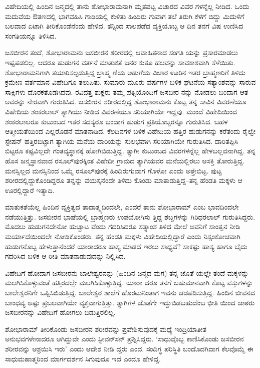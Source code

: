 ವಿಹೇದಿಯಲ್ಲಿ ಹಿಂದಿನ ಜನ್ಮದಲ್ಲಿ ತಾನು ಶೋಭಾರಾಮನಾಗಿ ಮೃತಪಟ್ಟ ವಿಚಾರದ ವಿವರ ಗಳನ್ನೆಲ್ಲ ನೀಡಿದ. ಒಂದು ಮದುವೆಯ ಔತಣದಲ್ಲಿ ಭಾಗವಹಿಸಿ ಗಾಡಿಯಲ್ಲಿ ಕುಳಿತು ಹಿಂದಿರು ಗುವಾಗ ತಲೆ ತಿರುಗಿ ಕೆಳಗೆ ಬಿದ್ದು ಮಿದುಳಿಗೆ ಬಲವಾದ ಏಟಾಗಿ ತೀರಿಕೊಂಡೆನೆಂದು ಹೇಳಿದ. ತನ್ನಿಂದ ಸಾಲಪಡೆದ ವ್ಯಕ್ತಿಯೊಬ್ಬ ಆ ದಿನ ತನಗೆ ವಿಷ ಉಣಿಸಿದ ಸಂಗತಿಯನ್ನೂ ತಿಳಿಸಿದ.

ಜಸಬೀರನ ತಂದೆ, ಶೋಭಾರಾಮನು ಜಸಬೀರನ ಶರೀರದಲ್ಲಿ ಆವಾಹಿತನಾದ ಸಂಗತಿ ಯನ್ನು ಪ್ರಸಾರಮಾಡಲು ಇಷ್ಟಪಡಲಿಲ್ಲ. ಆದರೂ ಹುಡುಗನ ವರ್ತನೆ ಮಾತುಕತೆ ಜನರ ಕುತೂ ಹಲವನ್ನು ಸಾವಕಾಶವಾಗಿ ಸೆಳೆಯಿತು. ಶೋಭಾರಾಮನಿಗಾಗಿ ತಯಾರಿಸಲ್ಪಡುತ್ತಿದ್ದ ಬ್ರಾಹ್ಮ ಣಿಯ ಅಡುಗೆಯ ವಿಚಾರ ಊರಿನ ಇತರ ಬ್ರಾಹ್ಮಣರಿಗೆ ತಿಳಿದು ಕ್ರಮೇಣ ವರ್ತಮಾನ ವಿಹೇದಿಗೂ ತಲುಪಿತು. ಸುಮಾರು ಮೂರು ವರ್ಷಗಳ ಬಳಿಕ ಘಟನೆಯ ಸತ್ಯಾಂಶವನ್ನು ಸಾರುವ ಸಾಕ್ಷಿಗಳು ದೊರಕತೊಡಗಿದವು. ರವಿದತ್ತ ಶುಕ್ಲರು ತಮ್ಮ ಪತ್ನಿಯೊಂದಿಗೆ ಜಸಬೀರ ನನ್ನು ನೋಡಲು ಬಂದಾಗ ಆತ ಅವರನ್ನು ನೇರವಾಗಿ ಗುರುತಿಸಿದ. ಜಸಬೀರನ ಶರೀರದಲ್ಲಿದ್ದ ಶೋಭಾರಾಮನು ಕೊಟ್ಟ ತನ್ನ ಸಾವಿನ ವಿವರಣೆಯೂ ವಿಹೇದಿಯ ಶಂಕರಲಾಲ್ ತ್ಯಾಗಿಯು ನೀಡಿದ ವಿವರಣೆಯೂ ಸರಿಯಾಗಿಯೇ ಇದ್ದವು. ಮುಂದೆ ವಿಹೇದಿಯಿಂದ ಶಂಕರಲಾಲರೂ ಕುಟುಂಬದ ಇತರ ಸದಸ್ಯರೂ ಬಂದಾಗ ಹುಡುಗ ಪ್ರತಿಯೊಬ್ಬರನ್ನೂ ಗುರುತಿಸಿದ. ಬಹಳ ಆತ್ಮೀಯತೆಯಿಂದ ಎಲ್ಲರೊಡನೆ ಮಾತನಾಡಿದ. ಕೆಲದಿನಗಳ ಬಳಿಕ ವಿಹೇದಿಯ ಹತ್ತಿರ ಹುಡುಗನನ್ನು ಕರೆತಂದು ರೈಲ್ವೇ ಸ್ಟೇಷನ್ ಹತ್ತಿರಬಿಟ್ಟಾಗ ತ್ಯಾಗಿಯ ಮನೆಯ ದಾರಿಯನ್ನು ಸುಲಭವಾಗಿ ಸರಿಯಾಗಿಯೇ ಗುರುತಿಸಿದ. ದಾರಿತಪ್ಪಿಸಿ ಬಿಟ್ಟರೂ ಕಷ್ಟವಿಲ್ಲದೇ ಗಂತವ್ಯಸ್ಥಾನಕ್ಕೆ ಹೋಗಿಬಿಡುತ್ತಿದ್ದ. ತ್ಯಾಗೀ ಕುಟುಂಬದ ವಿವರಗಳನ್ನೆಲ್ಲ ಹೇಳಬಲ್ಲವನಾಗಿದ್ದ. ತನ್ನ ಹೊಸ ಜನ್ಮಸ್ಥಾನವಾದ ರಸೂಲ್​ಪುರಕ್ಕಿಂತ ವಿಹೇದೀ ಗ್ರಾಮದ ತ್ಯಾಗಿಯವರ ಮನೆಯಲ್ಲಿರಲು ಆಸಕ್ತಿ ತೋರುತ್ತಿದ್ದ. ಮನಸ್ಸಿಲ್ಲದ ಮನಸ್ಸಿನಿಂದ ಒಮ್ಮೆ ರಸೂಲ್​ಪುರಕ್ಕೆ ಹಿಂದಿರುಗುವಾಗ ಗೊಳೋ ಎಂದು ಅತ್ತೇಬಿಟ್ಟ. ಪುಟ್ಟ ಶರೀರದಲ್ಲಿದ್ದುಕೊಂಡಿದ್ದರೂ ತನ್ನನ್ನು ವಯಸ್ಕನೆಂದೇ ತಿಳಿದು ಕೊಂಡು ಮಾತಾಡುತ್ತಿದ್ದ–ತನ್ನ ಹೆಂಡತಿ ಮಕ್ಕಳು ಆ ಊರಲ್ಲಿದ್ದಾರೆ ಇತ್ಯಾದಿ.

ಮಾತುಕತೆಯೆಲ್ಲ ಹಿಂದಿನ ವ್ಯಕ್ತಿತ್ವದ ತಾದಾತ್ಮ್ಯದಿಂದಲೇ, ಎಂದರೆ ತಾನು ಶೋಭಾರಾಮ್ ಎಂಬ ಭಾವದಿಂದಲೇ ನಡೆಯುತ್ತಿತ್ತು. ಜಸಬೀರನ ಭಾಷೆಯಲ್ಲಿ ಬ್ರಾಹ್ಮಣರು ಉಪಯೋಗಿಸು ತ್ತಿದ್ದ ಶಬ್ದಗಳನ್ನು ಗಿರಿಧರಲಾಲ್ ಗುರುತಿಸಿದ್ದರು. ಮೊದಲು ಹುಡುಗನದೇನೋ ಹುಚ್ಚಾಟ ವೆಂದು ಗದರಿಸಿದರೂ ಸತ್ಯಾಂಶ ತಿಳಿದ ಮೇಲೆ ಅವನಿಗೆ ಸಾಂತ್ವನ ನೀಡಿ ಮರ್ಯಾದೆಯಿಂದಲೇ ನೋಡಿಕೊಂಡರು. ತನ್ನ ಹೆಂಡತಿ ಮಕ್ಕಳು ವಿಹೇದಿಯಲ್ಲಿದ್ದಾರೆ ಎಂದು ನಿಸ್ಸಂಕೋಚವಾಗಿ ಹುಡುಗನೊಬ್ಬ ಹೇಳುತ್ತಾನೆಂದರೆ ಯಾರಾದರೂ ಹಾಸ್ಯ ಮಾಡದೆ ಇರಲು ಸಾಧ್ಯವೆ? ಸಾಕಷ್ಟು ಹಾಸ್ಯ ಹಾಗೂ ಬೈದು ಗದರಿಸಿದ ಬಳಿಕ ಆ ರೀತಿ ಮಾತನಾಡುವುದನ್ನು ನಿಲ್ಲಿಸಿದ.

ವಿಹೇದಿಗೆ ಹೋದಾಗ ಜಸಬೀರನು ಬಾಲೇಶ್ವರನನ್ನು (ಹಿಂದಿನ ಜನ್ಮದ ಮಗ) ತನ್ನ ಜೊತೆ ಯಲ್ಲೇ ತಂದೆ ಮಕ್ಕಳನ್ನು ಮಲಗಿಸಿಕೊಳ್ಳುವಂತೆ ಹತ್ತಿರದಲ್ಲೇ ಮಲಗಿಸಿಕೊಳ್ಳುತ್ತಿದ್ದ. ಯಾರಾ ದರೂ ತನಗೆ ಬಹುಮಾನವಾಗಿ ಕೊಟ್ಟ ವಸ್ತುಗಳನ್ನು ಬಾಲೇಶ್ವರನಿಗೇ ಒಪ್ಪಿಸಿಬಿಡುತ್ತಿದ್ದ. ಬಾಲೇಶ್ವರ ಶಾಲೆಗೆ ಹೊರಟುನಿಂತಾಗ ಇವನು ಚಡಪಡಿಸುತ್ತಿದ್ದ. ಹಿಂದಿನ ಜೀವನದ ಬಾಂಧವ್ಯ ಅಷ್ಟು ಪ್ರಬಲವಾಗಿಯೇ ವ್ಯಕ್ತವಾಗುತ್ತಿತ್ತು. ತ್ಯಾಗಿಗಳ ಜೊತೆಗೇ ಇದ್ದುಬಿಡಬಹುದೆಂಬ ಭೀತಿ ಯಿಂದ ಜಾಠರು ಜಸಬೀರನನ್ನು ವಿಹೇದಿಗೆ ಹೋಗಲು ಬಿಡುತ್ತಿರಲಿಲ್ಲ.

ಶೋಭಾರಾಮ್ ತೀರಿಕೊಂಡು ಜಸಬೀರನ ಶರೀರವನ್ನು ಪ್ರವೇಶಿಸುವುದಕ್ಕೆ ಮಧ್ಯೆ ಇಂದ್ರಿಯಾತೀತ ಅನುಭವಗಳೇನಾದರೂ ಆಗಿದ್ದುವೇ ಎಂದು ಸ್ಟೀವನ್​ಸನ್ ಪ್ರಶ್ನಿಸಿದ್ದರು. ‘ಸಾಧುವೊಬ್ಬ ಕಾಣಿಸಿಕೊಂಡು ಜಸಬೀರನ ಶರೀರವನ್ನು ಆಶ್ರಯಿಸಿ ಇರು’ ಎಂದು ಆದೇಶ ನೀಡಿ ದ್ದರು ಎಂದ. ಸಂದಿಗ್ಧ ಪರಿಸ್ಥಿತಿ ಬಂದೊದಗಿದಾಗ ಕೆಲವೊಮ್ಮೆ ಈ ಸಾಧುಮಹಾತ್ಮರಿಂದ ಮಾರ್ಗದರ್ಶನ ಸಿಗುವುದೂ ಇದೆ ಎಂದೂ ಹೇಳಿದ್ದ.

